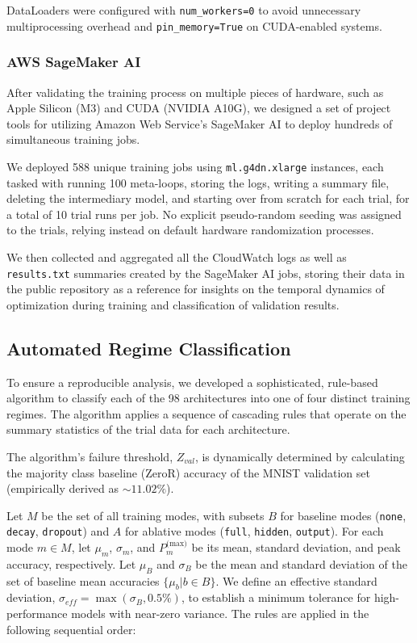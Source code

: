 \documentclass[conference]{IEEEtran}
\begin{document}
DataLoaders were configured with \texttt{num\_workers=0} to avoid unnecessary multiprocessing overhead and \texttt{pin\_memory=True} on CUDA-enabled systems.

\subsubsection{AWS SageMaker AI}

After validating the training process on multiple pieces of hardware, such as Apple Silicon (M3) and CUDA (NVIDIA A10G), we designed a set of project tools for utilizing Amazon Web Service's SageMaker AI to deploy hundreds of simultaneous training jobs.

We deployed 588 unique training jobs using \verb|ml.g4dn.xlarge| instances, each tasked with running 100 meta-loops, storing the logs, writing a summary file, deleting the intermediary model, and starting over from scratch for each trial, for a total of 10 trial runs per job. No explicit pseudo-random seeding was assigned to the trials, relying instead on default hardware randomization processes.

We then collected and aggregated all the CloudWatch logs as well as \verb|results.txt| summaries created by the SageMaker AI jobs, storing their data in the public repository as a reference for insights on the temporal dynamics of optimization during training and classification of validation results.

\subsection{Automated Regime Classification}

To ensure a reproducible analysis, we developed a sophisticated, rule-based algorithm to classify each of the 98 architectures into one of four distinct training regimes. The algorithm applies a sequence of cascading rules that operate on the summary statistics of the trial data for each architecture.

The algorithm's failure threshold, $Z_{val}$, is dynamically determined by calculating the majority class baseline (ZeroR) accuracy of the MNIST validation set (empirically derived as $\sim11.02\%$).

Let $M$ be the set of all training modes, with subsets $B$ for baseline modes (\texttt{none}, \texttt{decay}, \texttt{dropout}) and $A$ for ablative modes (\texttt{full}, \texttt{hidden}, \texttt{output}). For each mode $m \in M$, let $\mu_m$, $\sigma_m$, and $P_m^{\text{(max)}}$ be its mean, standard deviation, and peak accuracy, respectively. Let $\mu_B$ and $\sigma_B$ be the mean and standard deviation of the set of baseline mean accuracies $\{\mu_b | b \in B\}$. We define an effective standard deviation, $\sigma_{eff} = \max(\sigma_B, 0.5\%)$, to establish a minimum tolerance for high-performance models with near-zero variance. The rules are applied in the following sequential order:
\end{document}
